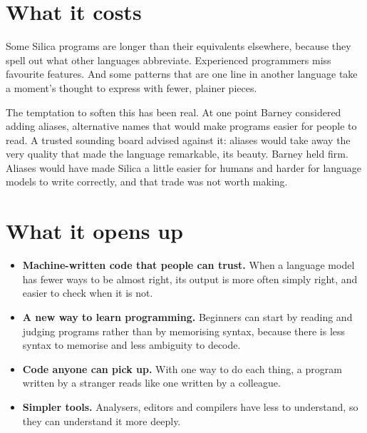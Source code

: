 \section{What it costs}

Some Silica programs are longer than their equivalents elsewhere, because they
spell out what other languages abbreviate. Experienced programmers miss
favourite features. And some patterns that are one line in another language take
a moment's thought to express with fewer, plainer pieces.

The temptation to soften this has been real. At one point Barney considered
adding aliases, alternative names that would make programs easier for people to
read. A trusted sounding board advised against it: aliases would take away the
very quality that made the language remarkable, its beauty. Barney held firm.
Aliases would have made Silica a little easier for humans and harder for
language models to write correctly, and that trade was not worth making.

\section{What it opens up}

\begin{itemize}
  \item \textbf{Machine-written code that people can trust.} When a language
        model has fewer ways to be almost right, its output is more often
        simply right, and easier to check when it is not.
  \item \textbf{A new way to learn programming.} Beginners can start by
        reading and judging programs rather than by memorising syntax, because
        there is less syntax to memorise and less ambiguity to decode.
  \item \textbf{Code anyone can pick up.} With one way to do each thing, a
        program written by a stranger reads like one written by a colleague.
  \item \textbf{Simpler tools.} Analysers, editors and compilers have less
        to understand, so they can understand it more deeply.
\end{itemize}

